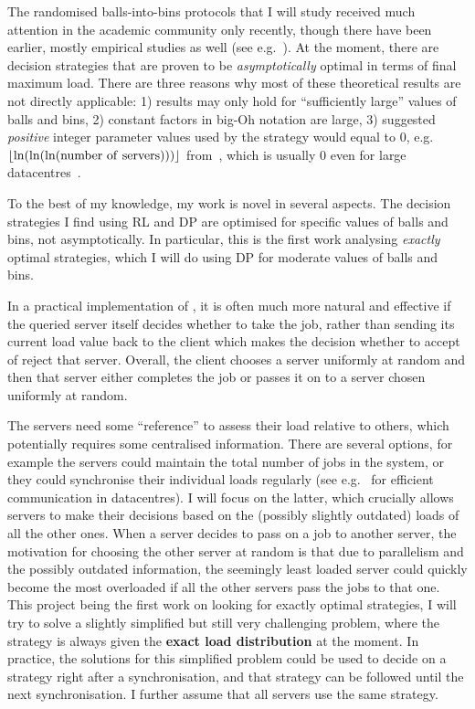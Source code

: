 The randomised balls-into-bins protocols that I will study received much attention in the academic community only recently, though there have been earlier, mostly empirical studies as well (see e.g.~\cite{derek1986twothinningfirstattempt}). At the moment, there are decision strategies that are proven to be \textit{asymptotically} optimal in terms of final maximum load. There are three reasons why most of these theoretical results are not directly applicable: 1) results may only hold for ``sufficiently large'' values of balls and bins, 2) constant factors in big-Oh notation are large, 3) suggested \textit{positive} integer parameter values used by the strategy would equal to $0$, e.g.\ $\floor{\ln(\ln(\ln(\mathrm{number\ of\ servers})))}$ from~\cite{feldheim2021longtermthinning}, which is usually $0$ even for large datacentres~\cite{uzaman2019datacentresize}.


To the best of my knowledge, my work is novel in several aspects. The decision strategies I find using RL and DP are optimised for specific values of balls and bins, not asymptotically. In particular, this is the first work analysing \textit{exactly} optimal strategies, which I will do using DP for moderate values of balls and bins.


In a practical implementation of \TwoThinning, it is often much more natural and effective if the queried server itself decides whether to take the job, rather than sending its current load value back to the client which makes the decision whether to accept of reject that server. Overall, the client chooses a server uniformly at random and then that server either completes the job or passes it on to a server chosen uniformly at random.

The servers need some ``reference'' to assess their load relative to others, which potentially requires some centralised information. There are several options, for example the servers could maintain the total number of jobs in the system, or they could synchronise their individual loads regularly (see e.g.~\cite{zhang2018datacenterloadbalancing} for efficient communication in datacentres). I will focus on the latter, which crucially allows servers to make their decisions based on the (possibly slightly outdated) loads of all the other ones. When a server decides to pass on a job to another server, the motivation for choosing the other server at random is that due to parallelism and the possibly outdated information, the seemingly least loaded server could quickly become the most overloaded if all the other servers pass the jobs to that one. This project being the first work on looking for exactly optimal strategies, I will try to solve a slightly simplified but still very challenging problem, where the strategy is always given the \textbf{exact load distribution} at the moment. In practice, the solutions for this simplified problem could be used to decide on a strategy right after a synchronisation, and that strategy can be followed until the next synchronisation. I further assume that all servers use the same strategy.


